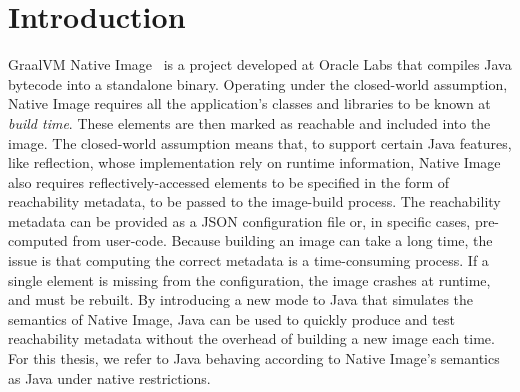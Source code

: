 \chapter{Introduction}




GraalVM Native Image~\cite{noauthor_native_nodate} is a project developed at Oracle Labs that compiles Java bytecode into a standalone binary. Operating under the closed-world assumption, Native Image requires all the application's classes and libraries  to be known at \emph{build time}.  These elements are then marked as reachable and included into the image.
The closed-world assumption means that, to support certain Java features, like reflection, whose implementation rely on runtime information, Native Image also requires reflectively-accessed elements to be specified in the form of reachability metadata, to be passed to the image-build process. The reachability metadata can be provided as a JSON configuration file or, in specific cases, pre-computed from user-code.
Because building an image can take a long time, the issue is that computing the correct metadata is a time-consuming process. If a single element is missing from the configuration, the image crashes at runtime, and must be rebuilt.
By introducing a new mode to Java that simulates the semantics of Native Image, Java can be used to quickly produce and test reachability metadata without the overhead of building a new image each time. For this thesis, we refer to Java behaving according to Native Image's semantics as Java under native restrictions.

